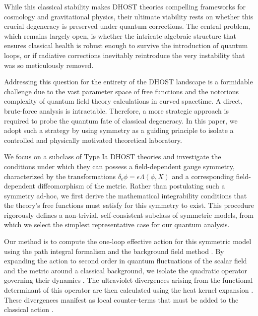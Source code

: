 \documentclass[twocolumn]{aastex631}
\begin{document}
While this classical stability makes DHOST theories compelling frameworks for cosmology and gravitational physics, their ultimate viability rests on whether this crucial degeneracy is preserved under quantum corrections. The central problem, which remains largely open, is whether the intricate algebraic structure that ensures classical health is robust enough to survive the introduction of quantum loops, or if radiative corrections inevitably reintroduce the very instability that was so meticulously removed.

Addressing this question for the entirety of the DHOST landscape is a formidable challenge due to the vast parameter space of free functions and the notorious complexity of quantum field theory calculations in curved spacetime. A direct, brute-force analysis is intractable. Therefore, a more strategic approach is required to probe the quantum fate of classical degeneracy. In this paper, we adopt such a strategy by using symmetry as a guiding principle to isolate a controlled and physically motivated theoretical laboratory.

We focus on a subclass of Type Ia DHOST theories and investigate the conditions under which they can possess a field-dependent gauge symmetry, characterized by the transformations $\delta_\epsilon \phi = \epsilon \Lambda(\phi, X)$ and a corresponding field-dependent diffeomorphism of the metric. Rather than postulating such a symmetry ad-hoc, we first derive the mathematical integrability conditions that the theory's free functions must satisfy for this symmetry to exist. This procedure rigorously defines a non-trivial, self-consistent subclass of symmetric models, from which we select the simplest representative case for our quantum analysis.

Our method is to compute the one-loop effective action for this symmetric model using the path integral formalism and the background field method \citep{ferrero2025oneloopeffectiveactioncoherent,ferrero2025oneloopeffectiveactioncoherent}. By expanding the action to second order in quantum fluctuations of the scalar field and the metric around a classical background, we isolate the quadratic operator governing their dynamics \citep{ferrero2025oneloopeffectiveactioncoherent}. The ultraviolet divergences arising from the functional determinant of this operator are then calculated using the heat kernel expansion \citep{branchina2024pathintegralmeasurecosmological,ferrero2025oneloopeffectiveactioncoherent}. These divergences manifest as local counter-terms that must be added to the classical action \citep{ferrero2025oneloopeffectiveactioncoherent}.
\end{document}
